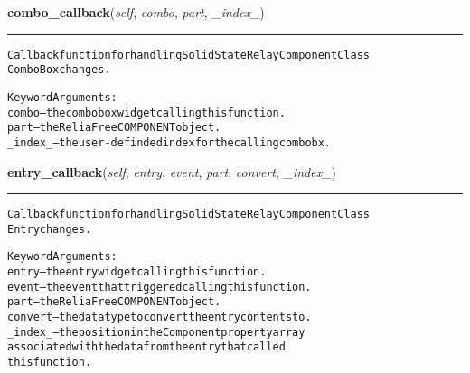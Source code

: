     \vspace{0.5ex}

\hspace{.8\funcindent}\begin{boxedminipage}{\funcwidth}

    \raggedright \textbf{combo\_callback}(\textit{self}, \textit{combo}, \textit{part}, \textit{\_index\_})

    \vspace{-1.5ex}

    \rule{\textwidth}{0.5\fboxrule}
\setlength{\parskip}{2ex}
\begin{alltt}
Callback function for handling Solid State Relay Component Class
ComboBox changes.

Keyword Arguments:
  combo -- the combobox widget calling this function.
   part -- the ReliaFree COMPONENT object.
\_index\_ -- the user-definded index for the calling combobx.
\end{alltt}

\setlength{\parskip}{1ex}
    \end{boxedminipage}

    \label{reliafree:relays:relay:SolidState:entry_callback}

    \vspace{0.5ex}

\hspace{.8\funcindent}\begin{boxedminipage}{\funcwidth}

    \raggedright \textbf{entry\_callback}(\textit{self}, \textit{entry}, \textit{event}, \textit{part}, \textit{convert}, \textit{\_index\_})

    \vspace{-1.5ex}

    \rule{\textwidth}{0.5\fboxrule}
\setlength{\parskip}{2ex}
\begin{alltt}
Callback function for handling Solid State Relay Component Class
Entry changes.

Keyword Arguments:
  entry -- the entry widget calling this function.
  event -- the event that triggered calling this function.
   part -- the ReliaFree COMPONENT object.
convert -- the data type to convert the entry contents to.
\_index\_ -- the position in the Component property array
           associated with the data from the entry that called
           this function.
\end{alltt}

\setlength{\parskip}{1ex}
    \end{boxedminipage}

